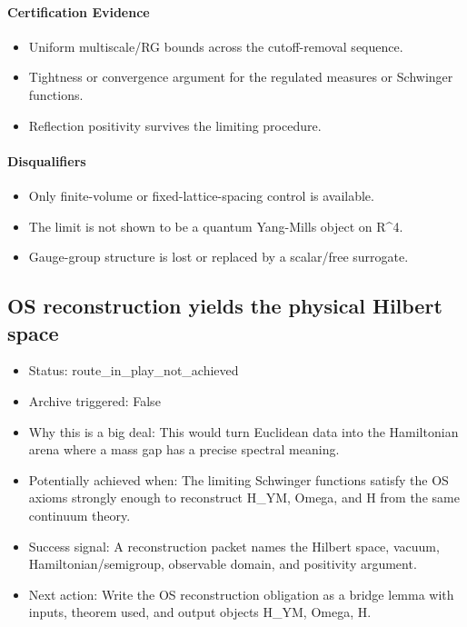 \documentclass[11pt]{article}
\begin{document}
\paragraph{Certification Evidence}

\begin{itemize}
\item Uniform multiscale/RG bounds across the cutoff-removal sequence.
\item Tightness or convergence argument for the regulated measures or Schwinger functions.
\item Reflection positivity survives the limiting procedure.
\end{itemize}

\paragraph{Disqualifiers}

\begin{itemize}
\item Only finite-volume or fixed-lattice-spacing control is available.
\item The limit is not shown to be a quantum Yang-Mills object on R\textasciicircum{}4.
\item Gauge-group structure is lost or replaced by a scalar/free surrogate.
\end{itemize}

\subsection*{OS reconstruction yields the physical Hilbert space}

\begin{itemize}
\item Status: route\_in\_play\_not\_achieved
\item Archive triggered: False
\item Why this is a big deal: This would turn Euclidean data into the Hamiltonian arena where a mass gap has a precise spectral meaning.
\item Potentially achieved when: The limiting Schwinger functions satisfy the OS axioms strongly enough to reconstruct H\_YM, Omega, and H from the same continuum theory.
\item Success signal: A reconstruction packet names the Hilbert space, vacuum, Hamiltonian/semigroup, observable domain, and positivity argument.
\item Next action: Write the OS reconstruction obligation as a bridge lemma with inputs, theorem used, and output objects H\_YM, Omega, H.
\end{itemize}
\end{document}
